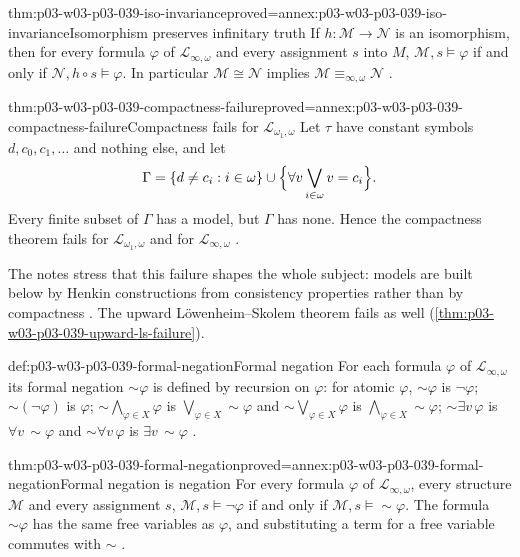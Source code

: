 \begin{hbtheorem}{thm:p03-w03-p03-039-iso-invariance}{proved=annex:p03-w03-p03-039-iso-invariance}{Isomorphism preserves infinitary truth}
If \(h:\mathcal M\to\mathcal N\) is an isomorphism, then for every formula
\(\varphi\) of \(\mathcal L_{\infty,\omega}\) and every assignment \(s\) into
\(M\), \(\mathcal M,s\models\varphi\) if and only if
\(\mathcal N,h\circ s\models\varphi\). In particular
\(\mathcal M\cong\mathcal N\) implies
\(\mathcal M\equiv_{\infty,\omega}\mathcal N\)
\cite[Ex.~1.4, p.~5]{Marker2014InfinitaryNotes}.
\end{hbtheorem}

\begin{hbtheorem}{thm:p03-w03-p03-039-compactness-failure}{proved=annex:p03-w03-p03-039-compactness-failure}{Compactness fails for \(\mathcal L_{\omega_1,\omega}\)}
Let \(\tau\) have constant symbols \(d,c_0,c_1,\ldots\) and nothing else, and let
\[
 \Gamma=\{d\ne c_i:i\in\omega\}\cup
        \Bigl\{\forall v\bigvee_{i\in\omega}v=c_i\Bigr\}.
\]
Every finite subset of \(\Gamma\) has a model, but \(\Gamma\) has none. Hence
the compactness theorem fails for \(\mathcal L_{\omega_1,\omega}\) and for
\(\mathcal L_{\infty,\omega}\) \cite[Ex.~1.5, p.~5]{Marker2014InfinitaryNotes}.
\end{hbtheorem}

The notes stress that this failure shapes the whole subject: models are
built below by Henkin constructions from consistency properties rather than
by compactness \cite[pp.~5--6, 39]{Marker2014InfinitaryNotes}. The upward
L\"owenheim--Skolem theorem fails as well
(\cref{thm:p03-w03-p03-039-upward-ls-failure}).

\begin{hbdefinition}{def:p03-w03-p03-039-formal-negation}{Formal negation}
For each formula \(\varphi\) of \(\mathcal L_{\infty,\omega}\) its formal
negation \({\sim}\varphi\) is defined by recursion on \(\varphi\): for atomic
\(\varphi\), \({\sim}\varphi\) is \(\neg\varphi\); \({\sim}(\neg\varphi)\) is
\(\varphi\); \({\sim}\bigwedge_{\varphi\in X}\varphi\) is
\(\bigvee_{\varphi\in X}{\sim}\varphi\) and
\({\sim}\bigvee_{\varphi\in X}\varphi\) is
\(\bigwedge_{\varphi\in X}{\sim}\varphi\); \({\sim}\exists v\,\varphi\) is
\(\forall v\,{\sim}\varphi\) and \({\sim}\forall v\,\varphi\) is
\(\exists v\,{\sim}\varphi\)
\cite[Def.~1.16, p.~8]{Marker2014InfinitaryNotes}.
\end{hbdefinition}

\begin{hblemma}{thm:p03-w03-p03-039-formal-negation}{proved=annex:p03-w03-p03-039-formal-negation}{Formal negation is negation}
For every formula \(\varphi\) of \(\mathcal L_{\infty,\omega}\), every
structure \(\mathcal M\) and every assignment \(s\),
\(\mathcal M,s\models\neg\varphi\) if and only if
\(\mathcal M,s\models{\sim}\varphi\). The formula \({\sim}\varphi\) has the
same free variables as \(\varphi\), and substituting a term for a free
variable commutes with \({\sim}\)
\cite[Ex.~1.17, p.~8]{Marker2014InfinitaryNotes}.
\end{hblemma}

